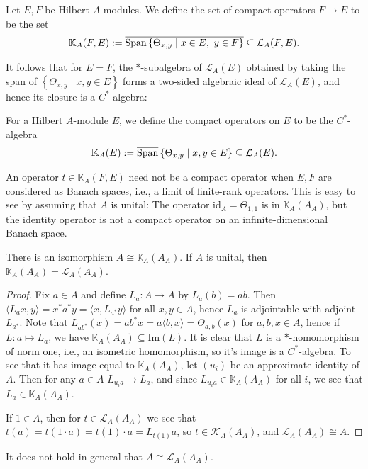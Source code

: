 \begin{definition}
	Let $E,F$ be Hilbert $A$-modules. We define the set of compact operators $F \to E$ to be the set
	\begin{align*}
		\mathbb{K}_A(F,E) := \overline{\mathrm{Span}\left\{ \Theta_{x,y} \mid x \in E, \ y \in F \right\}}\subseteq \mathcal{L}_A(F,E).
	\end{align*}
\end{definition}
It follows that for $E=F$, the $*$-subalgebra of $\mathcal{L}_A(E)$ obtained by taking the span of $\left\{ \Theta_{x,y} \mid x,y \in E \right\}$ forms a two-sided algebraic ideal of $\mathcal{L}_A(E)$, and hence its closure is a $C^*$-algebra:
\begin{definition}
	For a Hilbert $A$-module $E$, we define the compact operators on $E$ to be the $C^*$-algebra
	\begin{align*}
		\mathbb{K}_A(E):= \overline{\mathrm{Span}}\left\{ \Theta_{x,y} \mid x,y \in E \right\} \subseteq \mathcal{L}_A(E).
	\end{align*}
\end{definition}
\begin{note}
	An operator $t \in \mathbb{K}_A(F,E)$ need not be a compact operator when $E,F$ are considered as Banach spaces, i.e., a limit of finite-rank operators. This is easy to see by assuming that $A$ is unital: The operator $\mathrm{id}_A =\Theta_{1,1}$ is in $\mathbb{K}_A(A_A)$, but the identity operator is not a compact operator on an infinite-dimensional Banach space.
\end{note}
\begin{lemma}
	There is an isomorphism $A \cong \mathbb{K}_A(A_A)$. If $A$ is unital, then $\mathbb{K}_A(A_A) = \mathcal{L}_A(A_A)$.
	\label{mult:AisocompA}
\end{lemma}
\begin{proof}
	Fix $a \in A$ and define $L_a \colon A \to A$ by $L_a(b)=ab$. Then $\langle L_a x,y \rangle = x^* a^*y = \langle x, L_{a^*}y\rangle$ for all $x,y \in A$, hence $L_a$ is adjointable with adjoint $L_{a^*}$. Note that $L_{ab^*}(x) = ab^*x = a\langle b,x \rangle = \Theta_{a,b}(x)$ for $a,b,x \in A$, hence if $L\colon a \mapsto L_a$, we have $\mathbb{K}_A(A_A) \subseteq \mathrm{Im}(L)$. It is clear that $L$ is a $*$-homomorphism of norm one, i.e., an isometric homomorphism, so it's image is a $C^*$-algebra. To see that it has image equal to $\mathbb{K}_A(A_A)$, let $(u_i)$ be an approximate identity of $A$. Then for any $a \in A$ $L_{u_i a} \to L_{a}$, and since $L_{u_ia} \in \mathbb{K}_{A}(A_A)$ for all $i$, we see that $L_a \in \mathbb{K}_A(A_A)$.

	If $1 \in A$, then for $t \in \mathcal{L}_A(A_A)$ we see that $t(a)=t(1\cdot a)=t(1)\cdot a=L_{t(1)}a$, so $t \in \mathcal{K}_A(A_A)$, and $\mathcal{L}_A(A_A) \cong A$.
\end{proof}
\begin{note}
It does not hold in general that $A \cong \mathcal{L}_A(A_A)$.
\end{note}

